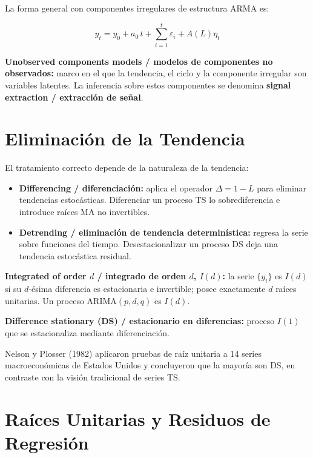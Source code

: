 \documentclass[12pt]{article}
\begin{document}
La forma general con componentes irregulares de estructura ARMA es:

\begin{equation}
  y_t = y_0 + a_0\,t + \sum_{i=1}^{t}\varepsilon_i + A(L)\eta_t
\end{equation}

\textbf{Unobserved components models / modelos de componentes no
observados:} marco en el que la tendencia, el ciclo y la componente
irregular son variables latentes. La inferencia sobre estos componentes
se denomina \textbf{signal extraction / extracci\'on de se\~nal}.

\section{Eliminaci\'on de la Tendencia}

El tratamiento correcto depende de la naturaleza de la tendencia:

\begin{itemize}
  \item \textbf{Differencing / diferenciaci\'on:} aplica el operador
        $\Delta = 1-L$ para eliminar tendencias estoc\'asticas. Diferenciar
        un proceso TS lo sobrediferencia e introduce ra\'ices MA no invertibles.
  \item \textbf{Detrending / eliminaci\'on de tendencia determin\'istica:}
        regresa la serie sobre funciones del tiempo. Desestacionalizar un
        proceso DS deja una tendencia estoc\'astica residual.
\end{itemize}

\textbf{Integrated of order $d$ / integrado de orden $d$, $I(d)$:} la
serie $\{y_t\}$ es $I(d)$ si su $d$-\'esima diferencia es estacionaria e
invertible; posee exactamente $d$ ra\'ices unitarias. Un proceso
ARIMA$(p,d,q)$ es $I(d)$.

\textbf{Difference stationary (DS) / estacionario en diferencias:}
proceso $I(1)$ que se estacionaliza mediante diferenciaci\'on.

Nelson y Plosser (1982) aplicaron pruebas de ra\'iz unitaria a 14 series
macroecon\'omicas de Estados Unidos y concluyeron que la mayor\'ia son DS,
en contraste con la visi\'on tradicional de series TS.

\section{Ra\'ices Unitarias y Residuos de Regresi\'on}
\end{document}
